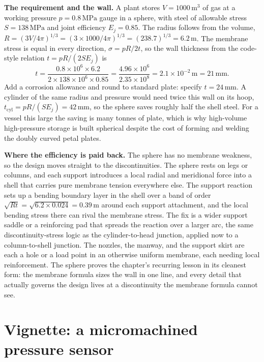 

\textbf{The requirement and the wall.} A plant stores
$V = 1000\,\text{m}^3$ of gas at a working pressure $p = 0.8\,\text{MPa}$
gauge in a sphere, with steel of allowable stress $S = 138\,\text{MPa}$
and joint efficiency $E_j = 0.85$. The radius follows from the volume,
$R = (3V/4\pi)^{1/3} = (3\times 1000/4\pi)^{1/3} = (238.7)^{1/3} =
6.2\,\si{\meter}$. The membrane stress is equal in every direction,
$\sigma = pR/2t$, so the wall thickness from the code-style relation
$t = pR/(2 S E_j)$ is
\[
t = \frac{0.8\times 10^6 \times 6.2}{2\times 138\times 10^6\times 0.85}
= \frac{4.96\times 10^6}{2.35\times 10^8}
= 2.1\times 10^{-2}\,\text{m} = 21\,\si{\milli\meter}.
\]
Add a corrosion allowance and round to standard plate: specify
$t = 24\,\si{\milli\meter}$. A cylinder of the same radius and pressure
would need twice this wall on its hoop, $t_{\text{cyl}} = pR/(S E_j) =
42\,\si{\milli\meter}$, so the sphere saves roughly half the shell steel.
For a vessel this large the saving is many tonnes of plate, which is why
high-volume high-pressure storage is built spherical despite the cost of
forming and welding the doubly curved petal plates.

\textbf{Where the efficiency is paid back.} The sphere has no membrane
weakness, so the design moves straight to the discontinuities. The sphere
rests on legs or columns, and each support introduces a local radial and
meridional force into a shell that carries pure membrane tension
everywhere else. The support reaction sets up a bending boundary layer in
the shell over a band of order $\sqrt{R t} = \sqrt{6.2\times 0.024} =
0.39\,\si{\meter}$ around each support attachment, and the local bending
stress there can rival the membrane stress. The fix is a wider support
saddle or a reinforcing pad that spreads the reaction over a larger arc,
the same discontinuity-stress logic as the cylinder-to-head junction,
applied now to a column-to-shell junction. The nozzles, the manway, and
the support skirt are each a hole or a load point in an otherwise uniform
membrane, each needing local reinforcement. The sphere proves the
chapter's recurring lesson in its cleanest form: the membrane formula
sizes the wall in one line, and every detail that actually governs the
design lives at a discontinuity the membrane formula cannot see.

\section{Vignette: a micromachined pressure sensor}

